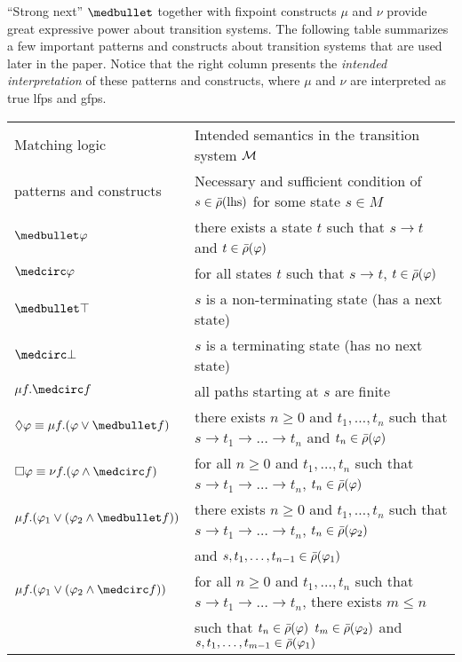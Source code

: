 \documentclass{amsart}
\begin{document}
``Strong next'' $\snext$ together with fixpoint constructs $\mu$ and $\nu$
provide great expressive power about transition systems.
The following table summarizes a few important patterns and constructs about
transition systems
that are used later in the paper.
Notice that the right column presents the \emph{intended interpretation} of
these
patterns and constructs, where $\mu$ and $\nu$ are interpreted as true lfps and
gfps.
\begin{center}
	\small
	\begin{tabular}{ll}
		Matching logic          &  Intended semantics in the transition system $\mathcal{M}$ \\
		patterns and constructs & Necessary and sufficient condition of $s \in
		\bar{\rho}(\text{lhs})$
		for some state $s \in M$
		\\\hline
		$\snext \varphi$ &
		there exists a state $t$ such that $s \to t$ and $t \in \bar{\rho}(\varphi)$
		\\
		$\wnext \varphi$ &
		for all states $t$ such that $s \to t$, $t \in \bar{\rho}(\varphi)$
		\\
		$\snext \top$ &
		$s$ is a non-terminating state (has a next state)
		\\
		$\wnext \bot$ &
		$s$ is a terminating state (has no next state)
		\\
		$\mu f . \wnext f$ &
		all paths starting at $s$ are finite 
		\\
		$\eventually \varphi \equiv \mu f . (\varphi \vee \snext f)$ &
		there exists $n \ge 0$ and $t_1 ,\dots, t_n$ such that 
		$s \to t_1 \to \dots \to t_n$ and $t_n \in \bar{\rho}(\varphi)$
		\\
		$\always \varphi \equiv \nu f . (\varphi \wedge \wnext f)$ &
		for all $n \ge 0$ and $t_1 ,\dots, t_n$ such that
		$s \to t_1 \to \dots \to t_n$, $t_n \in \bar{\rho}(\varphi)$
		\\
		$\mu f . (\varphi_1 \vee (\varphi_2 \wedge \snext f))$ &
		there exists $n \ge 0$ and $t_1 ,\dots, t_n$ such that 
		$s \to t_1 \to \dots \to t_n$, 
		$t_n \in \bar{\rho}(\varphi_2)$
		\\& and $s,t_1 ,\dots, t_{n-1} \in \bar{\rho}(\varphi_1)$
		\\
		$\mu f . (\varphi_1 \vee (\varphi_2 \wedge \wnext f))$ &
		for all $n \ge 0$ and $t_1 ,\dots, t_n$ such that
		$s \to t_1 \to \dots \to t_n$, 
		there exists $m \le n$ 
		\\&such that $t_n \in \bar{\rho}(\varphi)$
		$t_m \in \bar{\rho}(\varphi_2)$ and $s,t_1 ,\dots, t_{m-1} \in 
		\bar{\rho}(\varphi_1)$
	\end{tabular}
\end{center}
\end{document}

